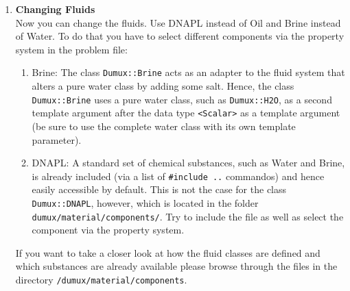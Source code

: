 \begin{enumerate}
\item \textbf{Changing Fluids} \\
Now you can change the fluids. Use DNAPL instead of Oil and Brine instead of Water. To do that you have to select different components via the property system in the problem file:
\begin{enumerate}
 \item Brine: The class \texttt{Dumux::Brine} acts as an adapter to the fluid system that alters a pure water class by adding some salt. Hence, the class \texttt{Dumux::Brine} uses a pure water class, such as \texttt{Dumux::H2O}, as a second template argument after the data type \texttt{<Scalar>} as a template argument (be sure to use the complete water class with its own template parameter).
 \item DNAPL: A standard set of chemical substances, such as Water and Brine, is already included (via a list of \texttt{\#include ..} commandos) and hence easily accessible by default. This is not the case for the class \texttt{Dumux::DNAPL}, however, which is located in the folder \texttt{dumux/material/components/}. Try to include the file as well as select the component via the property system.
\end{enumerate}
If you want to take a closer look at how the fluid classes are defined and which substances are already available please browse through the files in the directory
\texttt{/dumux/material/components}.


\end{enumerate}
